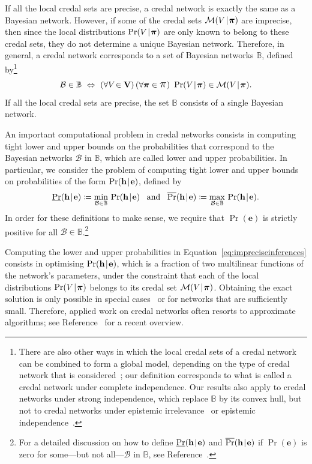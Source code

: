 \documentclass[10pt,a4paper]{paper}
\theoremstyle{definition}
\newcommand{\vbpi}{\boldsymbol\pi}
\newcommand{\vpi}{\scalebox{1.4}{\ensuremath\pi}}
\newcommand{\hyp}{\mathbf{h}}
\newcommand{\ev}{\mathbf{e}}
\newcommand{\credal}{\mathcal{M}}
\newcommand{\newmid}{\hspace{0.9pt}\vert\hspace{0.9pt}}
\begin{document}
If all the local credal sets are precise, a credal network is exactly the same as a Bayesian network.
However, if some of the credal sets $\credal(V\newmid\vbpi)$ are imprecise, then since the local distributions $\Pr(V\newmid\vbpi)$ are only known to belong to these credal sets, they do not determine a unique Bayesian network. Therefore, in general, a credal network corresponds to a set of Bayesian networks $\mathbb{B}$, defined by\footnote{There are also other ways in which the local credal sets of a credal network can be combined to form a global model, depending on the type of credal network that is considered~\cite{Cozman:2000ug}; our definition corresponds to what is called a credal network under complete independence. Our results also apply to credal networks under strong independence, which replace $\mathbb{B}$ by its convex hull, but not to credal networks under epistemic irrelevance~\cite{de2015credal,DeBock:2014bv,deCooman:2010gd} or epistemic independence~\cite{deCampos:2007kg}. 
}
\begin{equation*}
\mathcal{B}\in\mathbb{B}
~
\Leftrightarrow
~
(\forall V\!\in{\bf V})\,
(\forall \vbpi\in\vpi)~
\Pr(V\newmid\vbpi)\in\credal(V\newmid\vbpi).
\end{equation*}
If all the local credal sets are precise, the set $\mathbb{B}$ consists of a single Bayesian network.

An important computational problem in credal networks consists in computing tight lower and upper bounds on the probabilities that correspond to the Bayesian networks $\mathcal{B}$ in $\mathbb{B}$, which are called lower and upper probabilities.
In particular, we consider the problem of computing tight lower and upper bounds on probabilities of the form $\Pr(\hyp\newmid\ev)$, defined by 
\begin{equation}\label{eq:impreciseinferences}
\underline{\Pr}(\hyp \newmid \ev)
\coloneqq
\min_{\mathcal{B}\in\mathbb{B}}
\,
\Pr(\hyp \newmid \ev)
\text{~~\,and\,~~}
\overline{\Pr}(\hyp \newmid \ev)
\coloneqq
\max_{\mathcal{B}\in\mathbb{B}}\,
\Pr(\hyp \newmid \ev).
\end{equation}
\noindent In order for these definitions to make sense, we require that $\Pr(\ev)$ is strictly positive for all $\mathcal{B}\in\mathbb{B}$.\footnote{For a detailed discussion on how to define $\underline{\Pr}(\hyp \newmid \ev)$ and $\overline{\Pr}(\hyp \newmid \ev)$ if $\Pr(\ev)$ is zero for some---but not all---$\mathcal{B}$ in $\mathbb{B}$, see Reference~\cite{DeBock20151}.}

Computing the lower and upper probabilities in Equation~\eqref{eq:impreciseinferences} consists in optimising $\Pr(\hyp\newmid\ev)$, which is a fraction of two multilinear functions of the network's parameters, under the constraint that each of the local distributions $\Pr(V\newmid\vbpi)$ belongs to its credal set $\credal(V\newmid\vbpi)$. Obtaining the exact solution is only possible in special cases~\cite{Fagiuoli:1998ft,Maua:2014ti} or for networks that are sufficiently small. Therefore, applied work on credal networks often resorts to approximate algorithms; see Reference~\cite{Antonucci:2014ty} for a recent overview.
\end{document}
